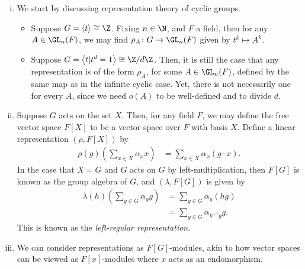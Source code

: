 \documentclass[10pt]{mypackage}
\begin{document}
\begin{example}\hfill
  \begin{enumerate}[(i)]
    \item We start by discussing representation theory of cyclic groups.
      \begin{itemize}
        \item Suppose $G = \left\langle t \right\rangle\cong \Z$. Fixing $n\in \N$, and $F$ a field, then for any $A\in \GL_n(F)$, we may find $\rho_A\colon G\rightarrow \GL_n(F)$ given by $t^{k}\mapsto A^{k}$.
        \item Suppose $G = \left\langle t | t^{d}=1 \right\rangle\cong \Z/d\Z$. Then, it is still the case that any representation is of the form $\rho_A$, for some $A\in \GL_n(F)$, defined by the same map as in the infinite cyclic case. Yet, there is not necessarily one for every $A$, since we need $o(A)$ to be well-defined and to divide $d$.
      \end{itemize}
    \item Suppose $G$ acts on the set $X$. Then, for any field $F$, we may define the free vector space $F[X]$ to be a vector space over $F$ with basis $X$. Define a linear representation $\left( \rho,F[X] \right)$ by
      \begin{align*}
        \rho(g)\left( \sum_{x\in X}\alpha_x x \right) &= \sum_{x\in X}\alpha_x \left( g\cdot x \right).
      \end{align*}
      In the case that $X = G$ and $G$ acts on $G$ by left-multiplication, then $F[G]$ is known as the group algebra of $G$, and $\left( \lambda,F[G] \right)$ is given by
      \begin{align*}
        \lambda(h)\left( \sum_{g\in G}\alpha_gg \right) &= \sum_{g\in G} \alpha_g \left( hg \right)\\
                                         &= \sum_{g\in G}\alpha_{h^{-1}g} g.
      \end{align*}
      This is known as the \textit{left-regular representation}.
    \item We can consider representations as $F[G]$-modules, akin to how vector spaces can be viewed as $F[x]$-modules where $x$ acts as an endomorphism.


\end{enumerate}
\end{example}
\end{document}
